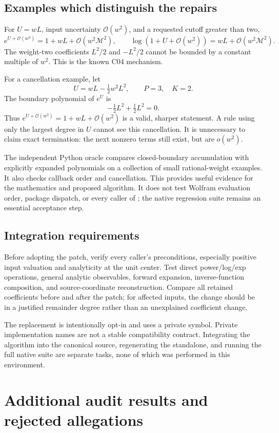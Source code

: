 \documentclass[11pt,a4paper]{article}
\newcommand{\code}[1]{\texttt{\detokenize{#1}}}
\newcommand{\OO}{\mathcal O}
\newcommand{\M}{\mathcal M}
\begin{document}
\subsection{Examples which distinguish the repairs}
For \(U=wL\), input uncertainty \(\OO(w^2)\), and a requested cutoff greater than two,
\[
 e^{U+\OO(w^2)}=1+wL+\OO(w^2\M^2),
 \qquad
 \log(1+U+\OO(w^2))=wL+\OO(w^2\M^2).
\]
The weight-two coefficients \(L^2/2\) and \(-L^2/2\) cannot be bounded by a constant multiple of \(w^2\). This is the known C04 mechanism.

For a cancellation example, let
\[
 U=wL-\tfrac12w^2L^2,
 \qquad P=3,\quad K=2.
\]
The boundary polynomial of \(e^U\) is
\[
 -\tfrac12L^2+\tfrac12L^2=0.
\]
Thus \(e^{U+\OO(w^3)}=1+wL+\OO(w^2)\) is a valid, sharper statement. A rule using only the largest degree in \(U\) cannot see this cancellation. It is unnecessary to claim exact termination: the next nonzero terms still exist, but are \(o(w^2)\).

The independent Python oracle compares closed-boundary accumulation with explicitly expanded polynomials on a collection of small rational-weight examples. It also checks callback order and cancellation. This provides useful evidence for the mathematics and proposed algorithm. It does not test Wolfram evaluation order, package dispatch, or every caller of \code{pUnitSeries}; the native regression suite remains an essential acceptance step.

\subsection{Integration requirements}
Before adopting the patch, verify every caller's preconditions, especially positive input valuation and analyticity at the unit center. Test direct power/log/exp operations, general analytic observables, forward expansion, inverse-function composition, and source-coordinate reconstruction. Compare all retained coefficients before and after the patch; for affected inputs, the change should be in a justified remainder degree rather than an unexplained coefficient change.

The replacement is intentionally opt-in and uses a private symbol. Private implementation names are not a stable compatibility contract. Integrating the algorithm into the canonical source, regenerating the standalone, and running the full native suite are separate tasks, none of which was performed in this environment.

\section{Additional audit results and rejected allegations}
\end{document}

